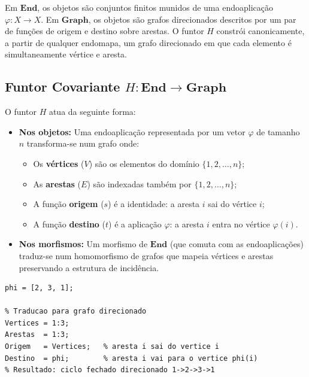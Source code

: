 Em $\mathbf{End}$, os objetos são conjuntos finitos munidos de uma endoaplicação $\varphi: X \to X$. Em $\mathbf{Graph}$, os objetos são grafos direcionados descritos por um par de funções de origem e destino sobre arestas. O funtor $H$ constrói canonicamente, a partir de qualquer endomapa, um grafo direcionado em que cada elemento é simultaneamente vértice e aresta.

\subsection{Funtor Covariante $H: \mathbf{End} \to \mathbf{Graph}$}

\begin{definition}
O funtor $H$ atua da seguinte forma:
\begin{itemize}
    \item \textbf{Nos objetos:} Uma endoaplicação representada por um vetor $\varphi$ de tamanho $n$ transforma-se num grafo onde:
    \begin{itemize}
        \item Os \textbf{vértices} ($V$) são os elementos do domínio $\{1, 2, \ldots, n\}$;
        \item As \textbf{arestas} ($E$) são indexadas também por $\{1, 2, \ldots, n\}$;
        \item A função \textbf{origem} ($s$) é a identidade: a aresta $i$ sai do vértice $i$;
        \item A função \textbf{destino} ($t$) é a aplicação $\varphi$: a aresta $i$ entra no vértice $\varphi(i)$.
    \end{itemize}
    \item \textbf{Nos morfismos:} Um morfismo de $\mathbf{End}$ (que comuta com as endoaplicações) traduz-se num homomorfismo de grafos que mapeia vértices e arestas preservando a estrutura de incidência.
\end{itemize}
\end{definition}

\begin{lstlisting}[style=matlab, caption={Funtor $H: \mathbf{End} \to \mathbf{Graph}$}]
% Endoaplicacao phi : {1,2,3} -> {1,2,3}
phi = [2, 3, 1];

% Traducao para grafo direcionado
Vertices = 1:3;
Arestas  = 1:3;
Origem   = Vertices;   % aresta i sai do vertice i
Destino  = phi;        % aresta i vai para o vertice phi(i)
% Resultado: ciclo fechado direcionado 1->2->3->1
\end{lstlisting}

